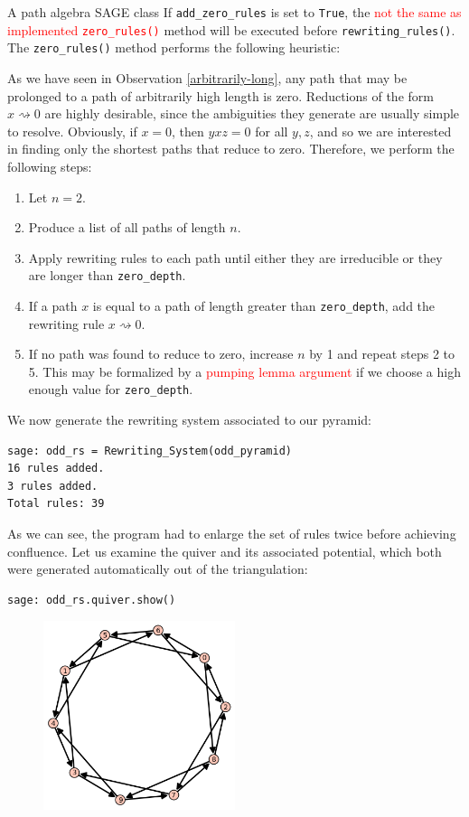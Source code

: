 \begin{chapter}{A path algebra SAGE class}
If \texttt{add\_zero\_rules} is set to \texttt{True}, the \textcolor{red}{not the same as implemented \texttt{zero\_rules()}} method will be executed before \texttt{rewriting\_rules()}. The \texttt{zero\_rules()} method performs the following heuristic:
\begin{heur} As we have seen in Observation \ref{arbitrarily-long},  any path that may be prolonged to a path of arbitrarily high length is zero. Reductions of the form $x\rightsquigarrow 0$ are highly desirable, since the ambiguities they generate are usually simple to resolve. Obviously, if $x=0$, then $yxz=0$ for all $y,z$, and so we are interested in finding only the shortest paths that reduce to zero. Therefore, we perform the following steps:
\begin{enumerate}
\item Let $n=2$.
\item Produce a list of all paths of length $n$.
\item Apply rewriting rules to each path until either they are irreducible or they are longer than \texttt{zero\_depth}.
\item If a path $x$ is equal to a path of length greater than \texttt{zero\_depth}, add the rewriting rule $x\rightsquigarrow 0$.
\item If no path was found to reduce to zero, increase $n$ by 1 and repeat steps 2 to 5.
This may be formalized by a \textcolor{red}{pumping lemma argument} if we choose a high enough value for \texttt{zero\_depth}.
\end{enumerate}
We now generate the rewriting system associated to our pyramid:
\end{heur}
\begin{lstlisting}
sage: odd_rs = Rewriting_System(odd_pyramid)
16 rules added.
3 rules added.
Total rules: 39
\end{lstlisting}
As we can see, the program had to enlarge the set of rules twice before achieving confluence. Let us examine the quiver and its associated potential, which both were generated automatically out of the triangulation:
\begin{lstlisting}
sage: odd_rs.quiver.show()
\end{lstlisting}
\begin{figure}[h]
\centering
\includegraphics[width=0.5\textwidth]{odd_quiver.png}

\end{figure}
\end{chapter}
